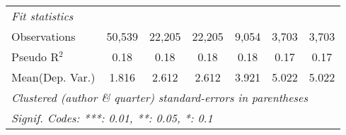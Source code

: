 \begin{tabular}{lcccccc}
   \midrule
   \emph{Fit statistics}\\
   Observations            & 50,539  & 22,205  & 22,205  & 9,054       & 3,703   & 3,703\\  
   Pseudo R$^2$            & 0.18    & 0.18    & 0.18    & 0.18        & 0.17    & 0.17\\  
Mean(Dep. Var.) & 1.816 & 2.612 & 2.612 & 3.921 & 5.022 & 5.022 \\
   \midrule \midrule
   \multicolumn{7}{l}{\emph{Clustered (author \& quarter) standard-errors in parentheses}}\\
   \multicolumn{7}{l}{\emph{Signif. Codes: ***: 0.01, **: 0.05, *: 0.1}}\\
\end{tabular}
\par\endgroup
